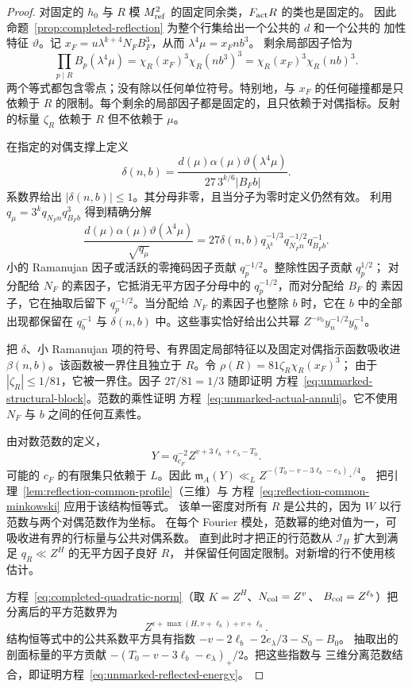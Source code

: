 \begin{proof}
对固定的 $h_0$ 与 $R$ 模 $M_{\rm ref}^2$ 的固定同余类，$F_{\rm act}R$ 的类也是固定的。
因此命题~\ref{prop:completed-reflection} 为整个行集给出一个公共的 $d$ 和一个公共的
加性特征 $\vartheta$。记 $x_F=u\lambda^{k+4}N_FB_F^3$，从而 $\lambda^4\mu=x_Fnb^3$。
剩余局部因子恰为
\[
 \prod_{p\mid R}B_p(\lambda^4\mu)
 =\chi_R(x_F)^3\chi_R(nb^3)^3
 =\chi_R(x_F)^3\chi_R(nb)^3.
\]
两个等式都包含零点；没有除以任何单位符号。特别地，与 $x_F$ 的任何碰撞都是只依赖于
$R$ 的限制。每个剩余的局部因子都是固定的，且只依赖于对偶指标。反射的标量
$\zeta_R$ 依赖于 $R$ 但不依赖于 $\mu$。

在指定的对偶支撑上定义
\[
 \delta(n,b)=
 \frac{d(\mu)\alpha(\mu)\vartheta(\lambda^4\mu)}
      {27\,3^{k/6}|B_Fb|}.
\]
系数界给出 $|\delta(n,b)|\le1$。其分母非零，且当分子为零时定义仍然有效。
利用 $q_\mu=3^kq_{N_Fn}q_{B_Fb}^3$ 得到精确分解
\[
 \frac{d(\mu)\alpha(\mu)\vartheta(\lambda^4\mu)}{\sqrt{q_\mu}}
 =27\delta(n,b)q_{\lambda^k}^{-1/3}
                  q_{N_Fn}^{-1/2}q_{B_Fb}^{-1}.
\]
小的 Ramanujan 因子或活跃的零掩码因子贡献 $q_p^{-1/2}$。整除性因子贡献 $q_p^{1/2}$；
对分配给 $N_F$ 的素因子，它抵消无平方因子分母中的 $q_p^{-1/2}$，而对分配给 $B_F$ 的
素因子，它在抽取后留下 $q_p^{-1/2}$。当分配给 $N_F$ 的素因子也整除 $b$ 时，它在 $b$
中的全部出现都保留在 $q_b^{-1}$ 与 $\delta(n,b)$ 中。这些事实恰好给出公共幂
$Z^{-\nu_0}y_n^{-1/2}y_b^{-1}$。

把 $\delta$、小 Ramanujan 项的符号、有界固定局部特征以及固定对偶指示函数吸收进
$\beta(n,b)$。该函数被一界住且独立于 $R$。令 $\rho(R)=81\zeta_R\chi_R(x_F)^3$；
由于 $|\zeta_R|\le1/81$，它被一界住。因子 $27/81=1/3$ 随即证明
方程~\eqref{eq:unmarked-structural-block}。范数的乘性证明
方程~\eqref{eq:unmarked-actual-annuli}。它不使用 $N_F$ 与 $b$ 之间的任何互素性。

由对数范数的定义，
\[
 Y=q_{c_F}^{-2}Z^{v+3\ell_b+e_\lambda-T_0}.
\]
可能的 $c_F$ 的有限集只依赖于 $L$。因此
$\mathfrak m_A(Y)\ll_L Z^{-(T_0-v-3\ell_b-e_\lambda)_+/4}$。
把引理~\ref{lem:reflection-common-profile}（三维）与
方程~\eqref{eq:reflection-common-minkowski} 应用于该结构恒等式。
该单一密度对所有 $R$ 是公共的，因为 $W$ 以行范数与两个对偶范数作为坐标。
在每个 Fourier 模处，范数幂的绝对值为一，可吸收进有界的行标量与公共对偶系数。
直到此时才把正的行范数从 $\mathcal I_H$ 扩大到满足 $q_R\ll Z^H$ 的无平方因子良好 $R$，
并保留任何固定限制。对新增的行不使用核估计。

方程~\eqref{eq:completed-quadratic-norm}（取 $K=Z^H$、$N_{\rm col}=Z^v$、
$B_{\rm col}=Z^{\ell_b}$）把分离后的平方范数界为
\[
 Z^{\epsilon+\max(H,v+\ell_b)+v+\ell_b}.
\]
结构恒等式中的公共系数平方具有指数 $-v-2\ell_b-2e_\lambda/3-S_0-B_0$。
抽取出的剖面标量的平方贡献 $-(T_0-v-3\ell_b-e_\lambda)_+/2$。把这些指数与
三维分离范数结合，即证明方程~\eqref{eq:unmarked-reflected-energy}。
\end{proof}

